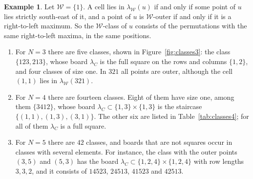 \documentclass[11pt]{amsart}
\theoremstyle{definition}
\newtheorem{example}[theorem]{Example}
\theoremstyle{remark}
\newcommand{\cW}{\mathcal{W}}
\begin{document}
\begin{example}\label{ex:classes}
Let $\cW=\{1\}$. A cell lies in $\lambda_\cW(u)$ if and only if some point of $u$ lies strictly south-east of it, and a point of $u$ is $\cW$-outer if and only if it is a right-to-left maximum. So the $\cW$-class of $u$ consists of the permutations with the same right-to-left maxima, in the same positions.
\begin{enumerate}
\item For $N=3$ there are five classes, shown in Figure~\ref{fig:classes3}: the class $\{123,213\}$, whose board $\lambda_C$ is the full square on the rows and columns $\{1,2\}$, and four classes of size one. In $321$ all points are outer, although the cell $(1,1)$ lies in $\lambda_\cW(321)$.
\item For $N=4$ there are fourteen classes. Eight of them have size one, among them $\{3412\}$, whose board $\lambda_C\subset\{1,3\}\times\{1,3\}$ is the staircase $\{(1,1),(1,3),(3,1)\}$. The other six are listed in Table~\ref{tab:classes4}; for all of them $\lambda_C$ is a full square.
\item For $N=5$ there are $42$ classes, and boards that are not squares occur in classes with several elements. For instance, the class with the outer points $(3,5)$ and $(5,3)$ has the board $\lambda_C\subset\{1,2,4\}\times\{1,2,4\}$ with row lengths $3,3,2$, and it consists of $14523$, $24513$, $41523$ and $42513$.
\end{enumerate}
\end{example}
\end{document}
